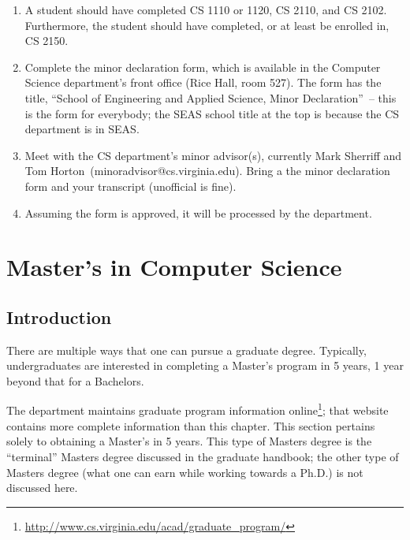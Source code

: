 \documentclass[10pt,letter]{book}
\makeatletter
\newenvironment{numlist}{
\begin{enumerate}
\setlength{\itemsep}{0pt}
\setlength{\parskip}{0pt}}
{\end{enumerate}}
\newcommand{\csminoradvisor}{Mark Sherriff and Tom Horton}
\newcommand{\csminoradvisoremail}{minoradvisor@cs.virginia.edu}
\newcommand{\mychapter}[2]{\chapter{#1}\renewcommand{\leftmark}{\textsc{#2}}}
\newcommand{\mysection}[1]{\section{#1}\renewcommand{\rightmark}{#1}}
\newcommand{\myurl}[1]{\footnote{\scriptsize\url{#1}}}
\makeatother
\begin{document}
\begin{numlist}

\item A student should have completed CS 1110 or 1120, CS 2110, and CS
  2102. Furthermore, the student should have completed, or at least be
  enrolled in, CS 2150.

\item Complete the minor declaration form, which is available in the
  Computer Science department's front office (Rice Hall, room 527).
  The form has the title, ``School of Engineering and Applied Science,
  Minor Declaration''~-- this is the form for everybody; the SEAS
  school title at the top is because the CS department is in SEAS.

\item Meet with the CS department's minor advisor(s), currently
  \csminoradvisor\ (\csminoradvisoremail).  Bring a the minor
  declaration form and your transcript (unofficial is fine).

\item Assuming the form is approved, it will be processed by the
  department.

\end{numlist}


\clearpage
\mychapter{Master's in Computer Science}{Masters in CS}




\mysection{Introduction}

There are multiple ways that one can pursue a graduate degree.
Typically, undergraduates are interested in completing a Master's
program in 5 years, 1 year beyond that for a Bachelors.

The department maintains graduate program information
online\myurl{http://www.cs.virginia.edu/acad/graduate_program/}; that
website contains more complete information than this chapter.  This
section pertains solely to obtaining a Master's in 5 years.  This type
of Masters degree is the ``terminal'' Masters degree discussed in the
graduate handbook; the other type of Masters degree (what one can earn
while working towards a Ph.D.) is not discussed here.
\end{document}
